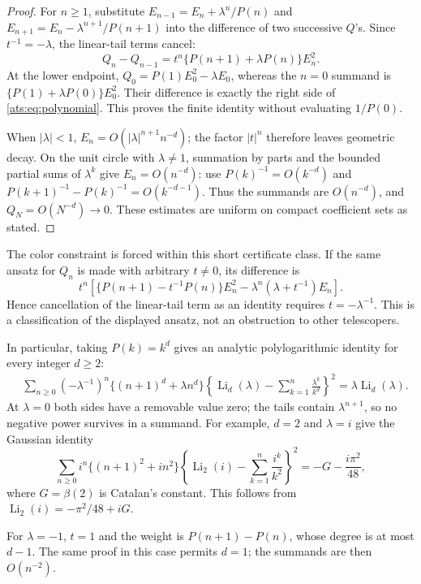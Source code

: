 \begin{proof}
For $n\ge1$, substitute
$E_{n-1}=E_n+\lambda^n/P(n)$ and
$E_{n+1}=E_n-\lambda^{n+1}/P(n+1)$ into the difference of two
successive $Q$'s. Since $t^{-1}=-\lambda$, the linear-tail terms cancel:
\[
 Q_n-Q_{n-1}
 =t^n\{P(n+1)+\lambda P(n)\}E_n^2.
\]
At the lower endpoint,
$Q_0=P(1)E_0^2-\lambda E_0$, whereas the $n=0$ summand is
$\{P(1)+\lambda P(0)\}E_0^2$. Their difference is exactly the
right side of \eqref{ats:eq:polynomial}. This proves the finite identity
without evaluating $1/P(0)$.

When $|\lambda|<1$, $E_n=O(|\lambda|^{n+1}n^{-d})$; the factor
$|t|^n$ therefore leaves geometric decay. On the unit circle with
$\lambda\ne1$, summation by parts and the bounded partial sums of
$\lambda^k$ give $E_n=O(n^{-d})$: use
$P(k)^{-1}=O(k^{-d})$ and
$P(k+1)^{-1}-P(k)^{-1}=O(k^{-d-1})$.
Thus the summands are $O(n^{-d})$, and $Q_N=O(N^{-d})\to0$.
These estimates are uniform on compact coefficient sets as stated.
\end{proof}

The color constraint is forced within this short certificate class.
If the same ansatz for $Q_n$ is made with arbitrary $t\ne0$, its
difference is
\[
 t^n\left[\{P(n+1)-t^{-1}P(n)\}E_n^2
      -\lambda^n(\lambda+t^{-1})E_n\right].
\]
Hence cancellation of the linear-tail term as an identity requires
$t=-\lambda^{-1}$. This is a classification of the displayed ansatz,
not an obstruction to other telescopers.

In particular, taking $P(k)=k^d$ gives an analytic polylogarithmic
identity for every integer $d\ge2$:
\begin{align}\label{ats:eq:polylog-tail}
 &\sum_{n\ge0}(-\lambda^{-1})^n\{(n+1)^d+\lambda n^d\}
   \left\{\operatorname{Li}_d(\lambda)
               -\sum_{k=1}^{n}\frac{\lambda^k}{k^d}\right\}^{\!2}
 =\lambda\operatorname{Li}_d(\lambda).
\end{align}
At $\lambda=0$ both sides have a removable value zero; the tails
contain $\lambda^{n+1}$, so no negative power survives in a summand.
For example, $d=2$ and $\lambda=i$ give the Gaussian identity
\[
 \sum_{n\ge0}i^n\{(n+1)^2+in^2\}
 \left\{\operatorname{Li}_2(i)-\sum_{k=1}^{n}\frac{i^k}{k^2}\right\}^{\!2}
 =-G-\frac{i\pi^2}{48},
\]
where $G=\beta(2)$ is Catalan's constant. This follows from
$\operatorname{Li}_2(i)=-\pi^2/48+iG$.

For $\lambda=-1$, $t=1$ and the weight is $P(n+1)-P(n)$, whose
degree is at most $d-1$. The same proof in this case permits $d=1$;
the summands are then $O(n^{-2})$.

